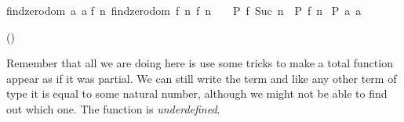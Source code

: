 \begin{isabellebody}
\begin{isamarkuptext}
  \noindent\begin{minipage}{0.79\textwidth}\begin{isabelle}%
{}findzero{}dom\ {}{}a{}{}{}{}\ {}a{}{}{}{}{}\isanewline
{}f\ n{}\ {}findzero{}dom\ {}f{}\ n{}{}\ f\ n\ {}\ {}\ {}\ {}P\ f\ {}Suc\ n{}{}\ {}\ {}P\ f\ n{}\isanewline
{}\ {}P\ {}a{}{}{}\ {}a{}{}{}%
\end{isabelle}\end{minipage}
  \hfill()%
\end{isamarkuptext}%
\isamarkuptrue%
%
\begin{isamarkuptext}%
Remember that all we
  are doing here is use some tricks to make a total function appear
  as if it was partial. We can still write the term  and like any other term of type  it is equal
  to some natural number, although we might not be able to find out
  which one. The function is \emph{underdefined}.


\end{isamarkuptext}
\end{isabellebody}
